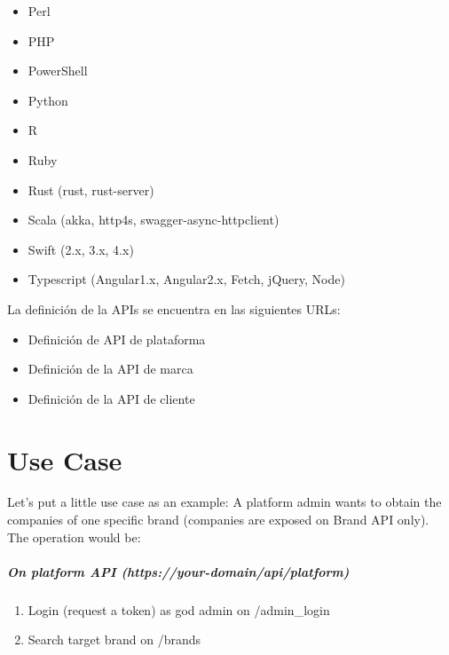 \documentclass[letterpaper,10pt,spanish]{sphinxmanual}
\begin{document}
\begin{itemize}
\item {} 
Perl

\item {} 
PHP

\item {} 
PowerShell

\item {} 
Python

\item {} 
R

\item {} 
Ruby

\item {} 
Rust (rust, rust-server)

\item {} 
Scala (akka, http4s, swagger-async-httpclient)

\item {} 
Swift (2.x, 3.x, 4.x)

\item {} 
Typescript (Angular1.x, Angular2.x, Fetch, jQuery, Node)

\end{itemize}

La definición de la APIs se encuentra en las siguientes URLs:
\begin{itemize}
\item {} 
Definición de API de plataforma

\item {} 
Definición de la API de marca

\item {} 
Definición de la API de cliente

\end{itemize}


\chapter{Use Case}
\label{api_rest/use_case:use-case}\label{api_rest/use_case::doc}\label{api_rest/use_case:id1}
Let's put a little use case as an example: A platform admin wants to obtain the companies of one specific brand (companies are exposed on Brand API only). The operation would be:
\paragraph{On platform API (https://your-domain/api/platform)}
\begin{enumerate}
\item {} 
Login (request a token) as god admin on /admin\_login

\item {} 
Search target brand on /brands

\end{enumerate}
\end{document}
